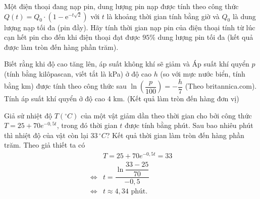 \begin{bt}%

	Một điện thoại đang nạp pin, dung lượng pin nạp được tính theo công thức $Q(t)=Q_0\cdot (1-\mathrm{e}^{-t\sqrt2})$ với $t$ là khoảng thời gian tính bằng giờ và $Q_0$ là dung lượng nạp tối đa (pin đầy). Hãy tính thời gian nạp pin của điện thoại tính từ lúc cạn hết pin cho đến khi điện thoại đạt được $95\%$ dung lượng pin tối đa (kết quả được làm tròn đến hàng phần trăm).
\end{bt}

\begin{bt}%
Biết rằng khi độ cao tăng lên, áp suất không khí sẽ giảm và Áp suất khí quyển $p$ (tính bằng kilôpascan, viết tắt là kPa) ở độ cao $h$ (so với mực nước biển, tính bằng km) được tính theo công thức sau $\ln\left(\dfrac{p}{100}\right) = -\dfrac{h}{7}$
(Theo britannica.com).  Tính áp suất khí quyển ở độ cao 4 km. (Kết quả làm tròn đến hàng đơn vị)
\end{bt}

\begin{bt}%

	Giả sử nhiệt độ $T({}^\circ C)$ của một vật giảm dần theo thời gian cho bởi công thức $T = 25 + 70e^{-0{,}5t}$, trong đó thời gian $t$ được tính bằng phút. Sau bao nhiêu phút thì nhiệt độ của vật còn lại $33\, {}^\circ C$? Kết quả thời gian làm tròn đến hàng phần trăm.
\loigiai
	{
		Theo giả thiết ta có
		\begin{align*}
			&T = 25 + 70e^{-0{,}5t} = 33\\
			\Leftrightarrow &t = \dfrac{\ln\dfrac{33-25}{70}}{-0{,}5}\\
			\Leftrightarrow &t \approx 4{,}34 \text{ phút}.
		\end{align*}
	}
\end{bt}

